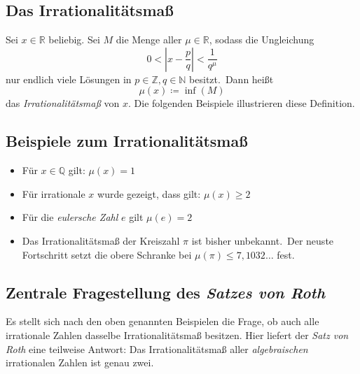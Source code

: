 \documentclass[11pt]{article}
\begin{document}
        \subsection{\textrm{Das Irrationalitätsmaß}}
        \label{subsec:irr-measure}
            \textrm{Sei $x \in \mathbb{R}$ beliebig. Sei $M$ die Menge aller $\mu \in \mathbb{R}$, sodass die Ungleichung
            \begin{equation*}
                0 < |x - \frac{p}{q}| < \frac{1}{q^\mu}
            \end{equation*}
            nur endlich viele Lösungen in $p \in \mathbb{Z}, q \in \mathbb{N}$
            besitzt.\ Dann heißt
            \begin{equation*}
                \mu(x) \coloneqq \inf(M)
            \end{equation*}
            das \emph{Irrationalitätsmaß} von $x$.
            \newline
            Die folgenden Beispiele illustrieren diese Definition.}

        \subsection{\textrm{Beispiele zum Irrationalitätsmaß}}
        \label{subsec:examples-irr-measure}
            \begin{itemize}
                \item \textrm{Für $x \in \mathbb{Q}$ gilt: $\mu(x) = 1$}
                \item \textrm{Für irrationale $x$ wurde gezeigt, dass gilt: $\mu(x) \geq 2$}
                \item \textrm{Für die \emph{eulersche Zahl} $e$ gilt $\mu(e) = 2$}
                \item \textrm{Das Irrationalitätsmaß der Kreiszahl $\pi$ ist bisher unbekannt.\ Der neuste Fortschritt
                            setzt die obere Schranke bei $\mu(\pi) \leq 7,1032\dots$ fest.}
            \end{itemize}

        \subsection{Zentrale Fragestellung des \emph{Satzes von Roth}}
        \label{subsec:question}
            \textrm{Es stellt sich nach den oben genannten Beispielen die Frage, ob auch alle irrationale Zahlen dasselbe
            Irrationalitätsmaß besitzen. Hier liefert der \emph{Satz von Roth} eine teilweise Antwort:
            \newline
            Das Irrationalitätsmaß aller \emph{algebraischen} irrationalen Zahlen ist genau zwei.}
\end{document}
